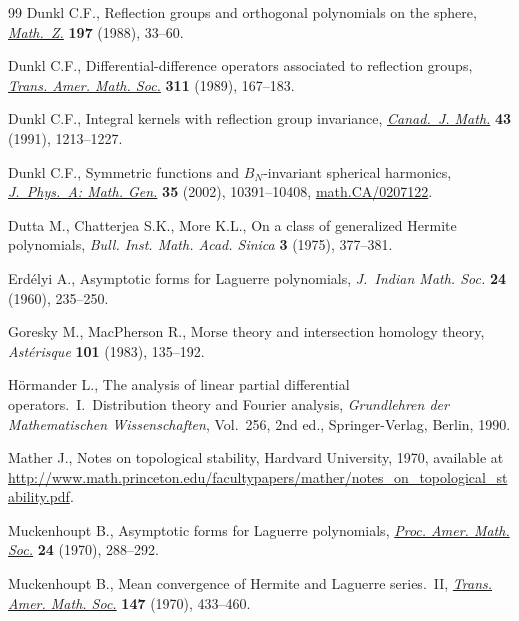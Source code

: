 \documentclass[pdftex]{sigma}
\begin{document}
\begin{thebibliography}{99}
Dunkl C.F., Ref\/lection groups and orthogonal polynomials on the sphere,
  \href{http://dx.doi.org/10.1007/BF01161629}{\textit{Math.~Z.}} \textbf{197} (1988), 33--60.

Dunkl C.F., Dif\/ferential-dif\/ference operators associated to ref\/lection groups,
  \href{http://dx.doi.org/10.2307/2001022}{\textit{Trans. Amer. Math. Soc.}} \textbf{311} (1989), 167--183.

Dunkl C.F., Integral kernels with ref\/lection group invariance,
  \href{http://dx.doi.org/10.4153/CJM-1991-069-8}{\textit{Canad.~J. Math.}} \textbf{43} (1991), 1213--1227.

Dunkl C.F., Symmetric functions and {$B_N$}-invariant spherical harmonics,
  \href{http://dx.doi.org/10.1088/0305-4470/35/48/312}{\textit{J.~Phys.~A: Math. Gen.}} \textbf{35} (2002), 10391--10408,
  \href{http://arxiv.org/abs/math.CA/0207122}{math.CA/0207122}.

Dutta M., Chatterjea S.K., More K.L., On a class of generalized {H}ermite
  polynomials, \textit{Bull. Inst. Math. Acad. Sinica} \textbf{3} (1975),
  377--381.

Erd{\'e}lyi A., Asymptotic forms for {L}aguerre polynomials, \textit{J.~Indian
  Math. Soc.} \textbf{24} (1960), 235--250.

Goresky M., MacPherson R., Morse theory and intersection homology theory,
  \textit{Ast\'erisque} \textbf{101} (1983), 135--192.

H{\"o}rmander L., The analysis of linear partial dif\/ferential operators.~{I}.~Distribution theory and Fourier ana\-lysis,
  \textit{Grundlehren der Mathematischen Wissenschaften}, Vol.~256, 2nd ed.,
  Springer-Verlag, Berlin, 1990.

Mather J., Notes on topological stability, Hardvard University, 1970, available at
  \url{http://www.math.princeton.edu/facultypapers/mather/notes_on_topological_stability.pdf}.

Muckenhoupt B., Asymptotic forms for {L}aguerre polynomials, \href{http://dx.doi.org/10.1090/S0002-9939-1970-0251272-9}{\textit{Proc.
  Amer. Math. Soc.}} \textbf{24} (1970), 288--292.

Muckenhoupt B., Mean convergence of {H}ermite and {L}aguerre series.~{II},
  \href{http://dx.doi.org/10.1090/S0002-9947-1970-0256051-9}{\textit{Trans. Amer. Math. Soc.}} \textbf{147} (1970), 433--460.


\end{thebibliography}
\end{document}
